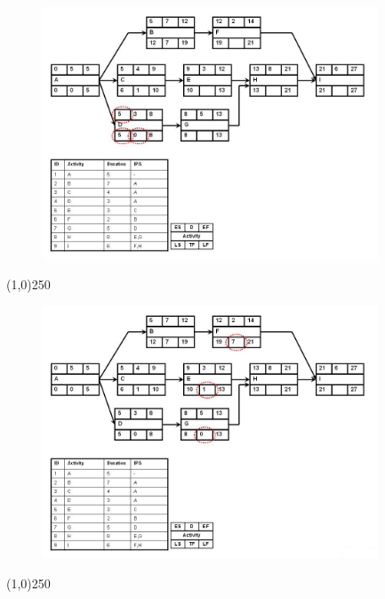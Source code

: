 \begin{frame}
\begin{figure}
	\centering
		\includegraphics[width = 10.0cm]{oldnotes/Slide164.jpg}
\end{figure}
\end{frame}
\begin{center}\line(1,0){250}\end{center}




\begin{frame}
\begin{figure}
	\centering
		\includegraphics[width = 10.0cm]{oldnotes/Slide165.jpg}
\end{figure}
\end{frame}
\begin{center}\line(1,0){250}\end{center}




